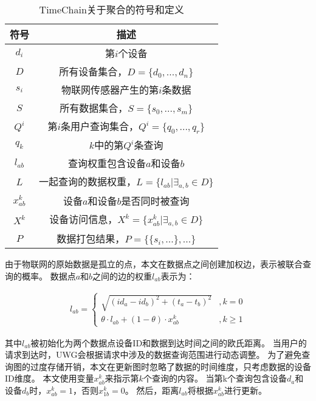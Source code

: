 \begin{table}
    \centering
    \caption{TimeChain关于聚合的符号和定义}
    \begin{tabular}{|c|c|}
        \hline
        \textbf{符号} & \textbf{描述} \\
        \hline
        $d_i$   & 第$i$个设备 \\
        \hline
        $D$     & 所有设备集合，$D = \{d_0, ..., d_n\}$\\
        \hline
        $s_i$   & 物联网传感器产生的第$i$条数据 \\
        \hline
        $S$     & 所有数据集合，$S = \{s_0, ..., s_m \}$\\
        \hline
        $Q^i$   & 第$i$条用户查询集合，$Q^i = \{ q_0, ..., q_r \}$\\
        \hline
        $q_k$   & $k$中的第$Q^i$条查询 \\
        \hline
        $l_{ab}$& 查询权重包含设备$a$和设备$b$ \\
        \hline
        $L$     & 一起查询的数据权重，$L = \{l_{ab} | \exists_{a,b} \in D \}$\\
        \hline
        $x^k_{ab}$ & 设备$a$和设备$b$是否同时被查询 \\
        \hline
        $X^k$   & 设备访问信息，$X^k = \{x^k_{ab} | \exists_{a,b} \in D \}$\\
        \hline
        $P$     & 数据打包结果，$P = \{ \{ s_i, ... \}, ... \}$\\
        \hline
    \end{tabular}
    \label{tab:notations}
\end{table}

由于物联网的原始数据是孤立的点，本文在数据点之间创建加权边，表示被联合查询的概率。
数据点$a$和$b$之间的边的权重$l_{ab}$表示为：

\begin{equation} 
    \label{eq:weight}
    \begin{split}
        l_{ab} =
        \begin{cases}
            \sqrt{ (id_a - id_b)^2 + (t_a - t_b)^2 } &, k = 0 \\  
            \theta \cdot l_{ab} + (1 - \theta) \cdot x_{ab}^k &, k \geq 1  
        \end{cases}
    \end{split}
\end{equation}

其中$l_{ab}$被初始化为两个数据点设备ID和数据到达时间之间的欧氏距离。
当用户的请求到达时，UWG会根据请求中涉及的数据查询范围进行动态调整。
为了避免查询图的过度存储开销，本文在更新图时忽略了数据的时间维度，只考虑数据的设备ID维度。
本文使用变量$x_{ab}^k$来指示第$k$个查询的内容。
当第k个查询包含设备$d_a$和设备$d_b$时，$x_{ab}^k=1$，否则$x_{1b}^k=0$。
然后，距离$l_{ab}$将根据$x_{ab}^k$进行更新。

